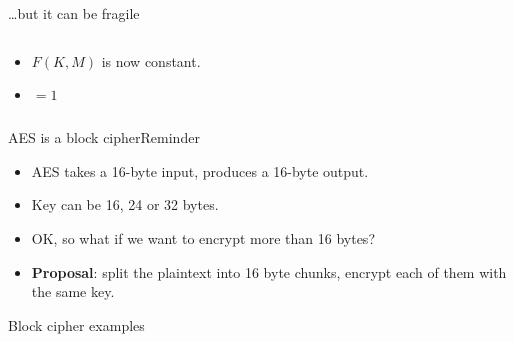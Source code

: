 \documentclass[aspectratio=169, lualatex, handout]{beamer}
\begin{document}
\begin{frame}{\ldots but it can be fragile}
	\begin{columns}[c]
		\begin{column}{0.5\textwidth}
			\begin{itemize}
				\item $F(K, M)$ is now constant.
				\item {} $ = 1$
			\end{itemize}
		\end{column}
		\begin{column}{0.5\textwidth}
		\end{column}
	\end{columns}
\end{frame}

\begin{frame}{AES is a block cipher}{Reminder}
	\begin{itemize}[<+->]
		\item AES takes a 16-byte input, produces a 16-byte output.
		\item Key can be 16, 24 or 32 bytes. \pause
		\item OK, so what if we want to encrypt more than 16 bytes? \pause
		\item \textbf{Proposal}: split the plaintext into 16 byte chunks, encrypt
		      each of them with the same key.
	\end{itemize}
\end{frame}

\begin{frame}{Block cipher examples}
	\begin{columns}
		\begin{column}{0.33\textwidth}
		\end{column}
		\pause
		\begin{column}{0.33\textwidth}
		\end{column}
		\pause
		\begin{column}{0.33\textwidth}
		\end{column}
	\end{columns}
\end{frame}
\end{document}
